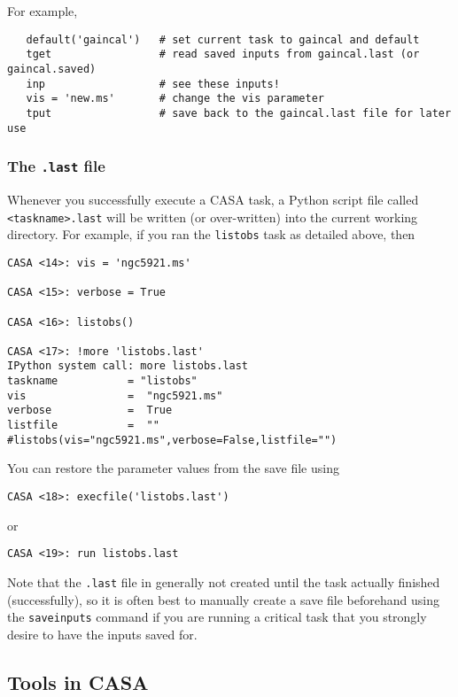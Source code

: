 For example,
\small
\begin{verbatim}
   default('gaincal')   # set current task to gaincal and default
   tget                 # read saved inputs from gaincal.last (or gaincal.saved)
   inp                  # see these inputs!
   vis = 'new.ms'       # change the vis parameter
   tput                 # save back to the gaincal.last file for later use
\end{verbatim}
\normalsize

\subsubsection{The {\tt .last} file}
\label{section:intro.tasks.setpar.last}

Whenever you successfully execute a CASA task, a Python script file
called {\tt <taskname>.last} will be written (or over-written) into
the current working directory.  For example, if you ran the
{\tt listobs} task as detailed above, then
\small
\begin{verbatim}
CASA <14>: vis = 'ngc5921.ms'

CASA <15>: verbose = True

CASA <16>: listobs()

CASA <17>: !more 'listobs.last'
IPython system call: more listobs.last
taskname           = "listobs"
vis                =  "ngc5921.ms"
verbose            =  True
listfile           =  ""
#listobs(vis="ngc5921.ms",verbose=False,listfile="")
\end{verbatim}
\normalsize

You can restore the parameter values from the save file using
\small
\begin{verbatim}
CASA <18>: execfile('listobs.last')
\end{verbatim}
\normalsize
or
\small
\begin{verbatim}
CASA <19>: run listobs.last
\end{verbatim}
\normalsize

Note that the {\tt .last} file in generally not created until
the task actually finished (successfully), so it is often best
to manually create a save file beforehand using the {\tt saveinputs} 
command if you are running a critical task that you strongly desire
to have the inputs saved for.

\subsection{Tools in CASA}
\label{section:intro.tasks.tools}

